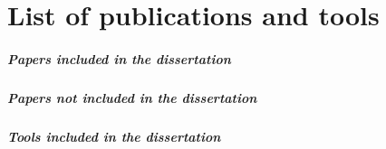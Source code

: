 \chapter*{List of publications and tools}

\paragraph{Papers included in the dissertation}


\paragraph{Papers not included in the dissertation}


\paragraph{Tools included in the dissertation}

	
	
	
